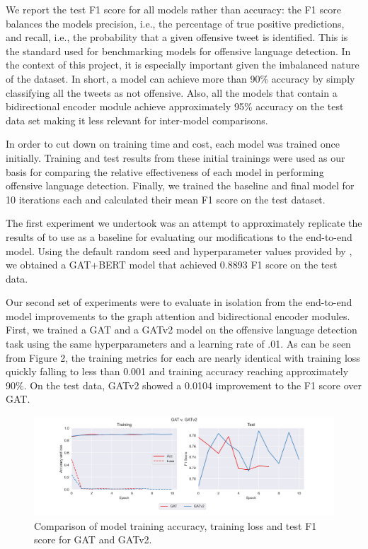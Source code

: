 \documentclass[letterpaper]{article} %
\begin{document}
We report the test F1 score for all models rather than accuracy: the F1 score balances the models precision, i.e., the percentage of true positive predictions, and recall, i.e., the probability that a given offensive tweet is identified. This is the standard used for benchmarking models for offensive language detection. In the context of this project, it is especially important given the imbalanced nature of the dataset. In short, a model can achieve more than 90\% accuracy by simply classifying all the tweets as not offensive. Also, all the models that contain a bidirectional encoder module achieve approximately 95\% accuracy on the test data set making it less relevant for inter-model comparisons. 

In order to cut down on training time and cost, each model was trained once initially. Training and test results from these initial trainings were used as our basis for comparing the relative effectiveness of each model in performing offensive language detection. Finally, we trained the baseline and final model for 10 iterations each and calculated their mean F1 score on the test dataset. 

The first experiment we undertook was an attempt to approximately replicate the results of \citet{Miao2022} to use as a baseline for evaluating our modifications to the end-to-end model. Using the default random seed and hyperparameter values provided by \citet{Miao2022}, we obtained a GAT+BERT model that achieved 0.8893 F1 score on the test data. 

Our second set of experiments were to evaluate in isolation from the end-to-end model improvements to the graph attention and bidirectional encoder modules. First, we trained a GAT and a GATv2 model on the offensive language detection task using the same hyperparameters and a learning rate of .01. As can be seen from Figure 2, the training metrics for each are nearly identical with training loss quickly falling to less than 0.001 and training accuracy reaching approximately 90\%. On the test data, GATv2 showed a 0.0104 improvement to the F1 score over GAT. 

\begin{figure}[!h]
    \includegraphics[width=\linewidth]{gat_v_gatv2.png}
    \caption{Comparison of model training accuracy, training loss and test F1 score for GAT and GATv2.}
\end{figure}
\end{document}

